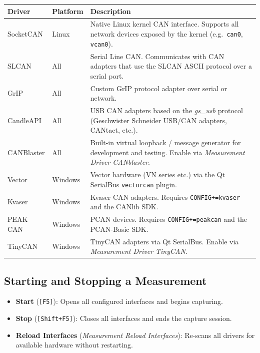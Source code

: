 \documentclass[a4paper,11pt]{article}
\newcommand{\key}[1]{\texttt{\small[#1]}}
\newcommand{\menu}[1]{\textit{#1}}
\newcommand{\ui}[1]{\textbf{#1}}
\begin{document}
\begin{longtable}{p{3.2cm} p{2.2cm} p{7.8cm}}
  \toprule
  \textbf{Driver} & \textbf{Platform} & \textbf{Description} \\
  \midrule
  \endhead
  SocketCAN       & Linux    & Native Linux kernel CAN interface. Supports all network
                               devices exposed by the kernel (e.g.\ \texttt{can0},
                               \texttt{vcan0}). \\[0.4em]
  SLCAN           & All      & Serial Line CAN. Communicates with CAN adapters
                               that use the SLCAN ASCII protocol over a serial port. \\[0.4em]
  GrIP            & All      & Custom GrIP protocol adapter over serial or network. \\[0.4em]
  CandleAPI       & All      & USB CAN adapters based on the \textit{gs\_usb} protocol
                               (Geschwister Schneider USB/CAN adapters, CANtact, etc.). \\[0.4em]
  CANBlaster      & All      & Built-in virtual loopback / message generator for
                               development and testing. Enable via
                               \menu{Measurement \textrightarrow{} Driver \textrightarrow{} CANblaster}. \\[0.4em]
  Vector          & Windows  & Vector hardware (VN series etc.) via the Qt SerialBus
                               \texttt{vectorcan} plugin. \\[0.4em]
  Kvaser          & Windows  & Kvaser CAN adapters. Requires \texttt{CONFIG+=kvaser}
                               and the CANlib SDK. \\[0.4em]
  PEAK CAN        & Windows  & PCAN devices. Requires \texttt{CONFIG+=peakcan}
                               and the PCAN-Basic SDK. \\[0.4em]
  TinyCAN         & Windows  & TinyCAN adapters via Qt SerialBus. Enable via
                               \menu{Measurement \textrightarrow{} Driver \textrightarrow{} TinyCAN}. \\
  \bottomrule
\end{longtable}

\subsection{Starting and Stopping a Measurement}

\begin{itemize}
  \item \ui{Start} (\key{F5}): Opens all configured interfaces and begins capturing.
  \item \ui{Stop} (\key{Shift+F5}): Closes all interfaces and ends the capture session.
  \item \ui{Reload Interfaces} (\menu{Measurement \textrightarrow{} Reload Interfaces}):
        Re-scans all drivers for available hardware without restarting.
\end{itemize}
\end{document}

